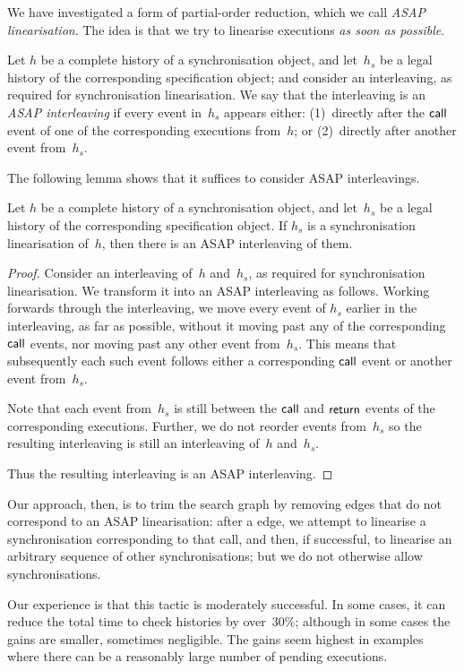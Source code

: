 We have investigated a form of partial-order reduction, which we call
\emph{ASAP linearisation}.  The idea is that we try to linearise executions
\emph{as soon as possible}.
%
\begin{definition}
Let $h$ be a complete history of a synchronisation object, and let~$h_s$ be a
legal history of the corresponding specification object; and consider an
interleaving, as required for synchronisation linearisation.  We say that the
interleaving is an \emph{ASAP interleaving} if every event in~$h_s$ appears
either: (1)~directly after the $\mathsf{call}$ event of one of the corresponding
executions from~$h$; or (2)~directly after another event from~$h_s$.
\end{definition}
%
The following lemma shows that it suffices to consider ASAP interleavings.
%
\begin{lemma}
Let $h$ be a complete history of a synchronisation object, and let~$h_s$ be a
legal history of the corresponding specification object.  If $h_s$ is a
synchronisation linearisation of~$h$, then there is an ASAP interleaving of
them.
\end{lemma}
%
\begin{proof}
Consider an interleaving of~$h$ and~$h_s$, as required for synchronisation
linearisation.  We transform it into an ASAP interleaving as follows.  Working
forwards through the interleaving, we move every event of $h_s$ earlier in the
interleaving, as far as possible, without it moving past any of the corresponding
$\mathsf{call}$ events, nor moving past any other event from~$h_s$.  This means that
subsequently each such event follows either a corresponding $\mathsf{call}$ event or
another event from~$h_s$.

Note that each event from~$h_s$ is still between the $\mathsf{call}$ and $\mathsf{return}$
events of the corresponding executions.  Further, we do not reorder events
from~$h_s$ so the resulting interleaving is still an interleaving of~$h$
and~$h_s$.

Thus the resulting interleaving is an ASAP interleaving.
\end{proof}
%
Our approach, then, is to trim the search graph by removing
 edges that do not correspond to an ASAP
linearisation: after a  edge, we attempt to linearise a
synchronisation corresponding to that call, and then, if successful, to
linearise an arbitrary sequence of other synchronisations; but we do not
otherwise allow synchronisations.

Our experience is that this tactic is moderately successful.  In some cases,
it can reduce the total time to check histories by over~30\%;
although in some cases the gains are smaller, sometimes negligible.  The gains
seem highest in examples where there can be a reasonably large number of
pending executions.
 
